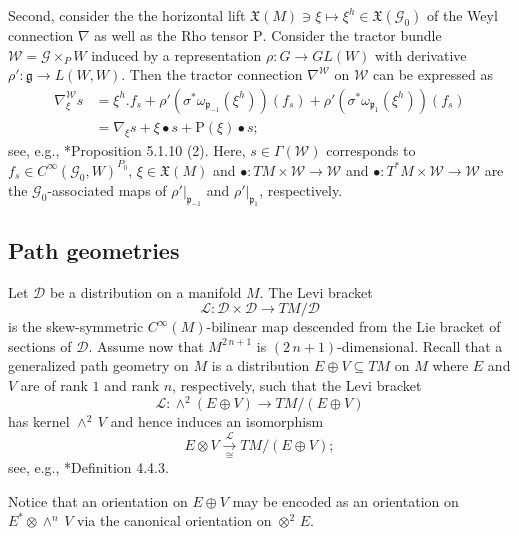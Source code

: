 \documentclass[11pt]{amsart}
\begin{document}
Second, consider the the horizontal lift $\mathfrak X(M)\ni\xi\mapsto\xi^h\in\mathfrak X(\mathcal G_0)$ of the Weyl connection $\nabla$ as well as the Rho tensor $\mathrm{P}$. Consider the tractor bundle $\mathcal W=\mathcal G\times_PW$ induced by a representation $\rho:G\to GL(W)$ with derivative $\rho':\mathfrak g\to L(W, W)$. Then the tractor connection $\nabla^{\mathcal W}$ on $\mathcal W$ can be expressed as
\begin{align}\label{tractor connection priliminary}
    \nabla^{\mathcal W}_{\xi} s
    &=\xi^h.f_s+
    \rho'(\sigma^*\omega_{\mathfrak p_{-1}}(\xi^h))(f_s)+\rho'(\sigma^*\omega_{\mathfrak p_1}(\xi^h))(f_s)\nonumber\\
    &=\nabla_\xi s +\xi\bullet s+\mathrm{P}(\xi)\bullet s;
\end{align}
see, e.g., \cite{Book}*{Proposition 5.1.10 (2)}.
Here, $s\in\Gamma(\mathcal W)$ corresponds to $f_s\in C^\infty(\mathcal G_0,W)^{P_0}$, $\xi\in\mathfrak X(M)$ and $\bullet:TM\times\mathcal W\to \mathcal W$ and $\bullet:T^*M\times\mathcal W\to \mathcal W$ are the $\mathcal G_0$-associated maps of $\rho'|_{\mathfrak p_{-1}}$ and $\rho'|_{\mathfrak p_{1}}$, respectively.

\subsection{Path geometries}\label{2.4}
Let $\mathcal D$ be a distribution on a manifold $M$. The Levi bracket \[\mathcal L:\mathcal D\times\mathcal D\to TM/\mathcal D\] is the skew-symmetric $C^\infty(M)$-bilinear map descended from the Lie bracket of sections of $\mathcal D$. Assume now that $M^{2\,n+1}$ is $(2\,n+1)$-dimensional. Recall that a generalized path geometry on $M$ is a distribution $E\oplus V\subseteq TM$ on $M$ where $E$ and $V$ are of rank $1$ and rank $n$, respectively, such that the Levi bracket
\[\mathcal L:\wedge^2(E\oplus V)\to TM/(E\oplus V)\]
has kernel $\wedge^2\,V$ and hence induces an isomorphism 
\[E\otimes V\xrightarrow[\cong]{\mathcal L}TM/(E\oplus V);\]
see, e.g., \cite{Book}*{Definition 4.4.3}.

Notice that an orientation on $E\oplus V$ may be encoded as an orientation on $E^*\otimes\wedge^n\,V$ via the canonical orientation on $\otimes^2\, E$.
\end{document}
